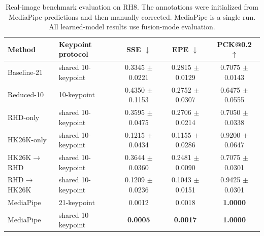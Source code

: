 \documentclass[10pt,letterpaper]{article}
\begin{document}
\begin{table}[H]
\centering
\footnotesize
\caption{Transfer-learning results for the four training sequences evaluated on both RHD and HK26K, using fusion-mode evaluation.}
\label{tab:transfer_learning}
\end{table}

\begin{table}[H]
\centering
\footnotesize
\caption{Real-image benchmark evaluation on RH8. The annotations were initialized from MediaPipe predictions and then manually corrected. MediaPipe is a single run. All learned-model results use fusion-mode evaluation.}
\label{tab:hand_frame_small_pilot}
\begin{tabular}{llccc}
\toprule
Method & Keypoint protocol & SSE $\downarrow$ & EPE $\downarrow$ & PCK@0.2 $\uparrow$ \\
\midrule
Baseline-21 & shared 10-keypoint & 0.3345 $\pm$ 0.0221 & 0.2815 $\pm$ 0.0129 & 0.7075 $\pm$ 0.0143 \\
Reduced-10 & 10-keypoint & 0.4350 $\pm$ 0.1153 & 0.2752 $\pm$ 0.0307 & 0.6475 $\pm$ 0.0555 \\
RHD-only & shared 10-keypoint & 0.3595 $\pm$ 0.0475 & 0.2706 $\pm$ 0.0214 & 0.7050 $\pm$ 0.0338 \\
HK26K-only & shared 10-keypoint & 0.1215 $\pm$ 0.0434 & 0.1155 $\pm$ 0.0286 & 0.9200 $\pm$ 0.0647 \\
HK26K$\rightarrow$RHD & shared 10-keypoint & 0.3644 $\pm$ 0.0360 & 0.2481 $\pm$ 0.0090 & 0.7075 $\pm$ 0.0301 \\
RHD$\rightarrow$HK26K & shared 10-keypoint & 0.1209 $\pm$ 0.0236 & 0.1043 $\pm$ 0.0151 & 0.9425 $\pm$ 0.0301 \\
MediaPipe & 21-keypoint & 0.0012 & 0.0018 & \textbf{1.0000} \\
MediaPipe & shared 10-keypoint & \textbf{0.0005} & \textbf{0.0017} & \textbf{1.0000} \\
\bottomrule
\end{tabular}
\end{table}
\end{document}

